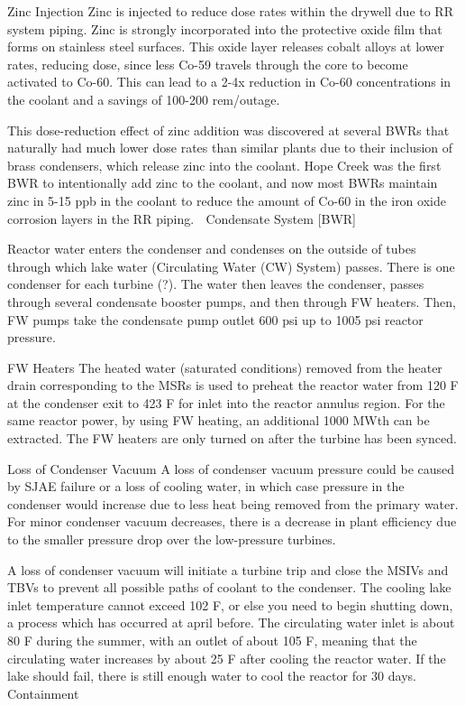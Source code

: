 \documentclass[10pt]{article}
\begin{document}
Zinc Injection
Zinc is injected to reduce dose rates within the drywell due to RR system piping. Zinc is strongly incorporated into the protective oxide film that forms on stainless steel surfaces. This oxide layer releases cobalt alloys at lower rates, reducing dose, since less Co-59 travels through the core to become activated to Co-60. This can lead to a 2-4x reduction in Co-60 concentrations in the coolant and a savings of 100-200 rem/outage.

This dose-reduction effect of zinc addition was discovered at several BWRs that naturally had much lower dose rates than similar plants due to their inclusion of brass condensers, which release zinc into the coolant. Hope Creek was the first BWR to intentionally add zinc to the coolant, and now most BWRs maintain zinc in 5-15 ppb in the coolant to reduce the amount of Co-60 in the iron oxide corrosion layers in the RR piping.  

Condensate System [BWR]

Reactor water enters the condenser and condenses on the outside of tubes through which lake water (Circulating Water (CW) System) passes. There is one condenser for each turbine (?). The water then leaves the condenser, passes through several condensate booster pumps, and then through FW heaters. Then, FW pumps take the condensate pump outlet 600 psi up to 1005 psi reactor pressure. 

FW Heaters
The heated water (saturated conditions) removed from the heater drain corresponding to the MSRs is used to preheat the reactor water from 120 F at the condenser exit to 423 F for inlet into the reactor annulus region. For the same reactor power, by using FW heating, an additional 1000 MWth can be extracted. The FW heaters are only turned on after the turbine has been synced. 

Loss of Condenser Vacuum
A loss of condenser vacuum pressure could be caused by SJAE failure or a loss of cooling water, in which case pressure in the condenser would increase due to less heat being removed from the primary water. For minor condenser vacuum decreases, there is a decrease in plant efficiency due to the smaller pressure drop over the low-pressure turbines. 

A loss of condenser vacuum will initiate a turbine trip and close the MSIVs and TBVs to prevent all possible paths of coolant to the condenser. The cooling lake inlet temperature cannot exceed 102 F, or else you need to begin shutting down, a process which has occurred at april before. The circulating water inlet is about 80 F during the summer, with an outlet of about 105 F, meaning that the circulating water increases by about 25 F after cooling the reactor water. If the lake should fail, there is still enough water to cool the reactor for 30 days. 

Containment
\end{document}
